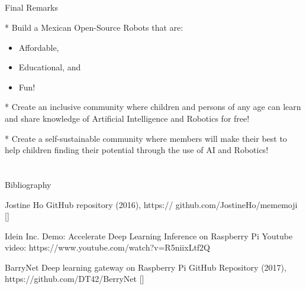 \documentclass[compress]{beamer}
\begin{document}
\subsection{}
{
\begin{frame}{Final Remarks}

* Build a Mexican Open-Source Robots that are:
\begin{itemize}
        \item Affordable, 
	\item Educational, and 
	\item Fun!
\end{itemize}

* Create an inclusive community where children and persons of any age can
learn and share knowledge of Artificial Intelligence and
Robotics for free!

* Create a self-sustainable community where
members will make their best to help 
children finding their potential 
through the use of AI and Robotics! 

\end{frame}
}











\section{}

\begin{frame}{Bibliography}
    \begin{thebibliography}{10}

\beamertemplatearticlebibitems
      Jostine Ho       
      \newblock {}
      \newblock GitHub repository (2016), https:// github.com/JostineHo/mememoji [\href{https:// github.com/JostineHo/mememoji}{\faGithub}]

	Idein Inc.
	\newblock Demo: Accelerate Deep Learning Inference on Raspberry Pi
	\newblock Youtube video: https://www.youtube.com/watch?v=R5niixLtf2Q

	BarryNet
	\newblock Deep learning gateway on Raspberry Pi
	\newblock GitHub Repository (2017), https://github.com/DT42/BerryNet [\href{https://github.com/DT42/BerryNet}{\faGithub}]

    \end{thebibliography}
\end{frame}




\closingtitle


\end{document}
